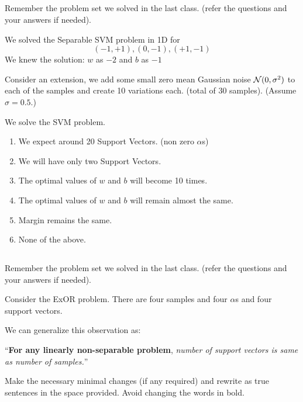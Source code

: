 \begin{frame}
\section{}
Remember the problem set we solved in the last class. (refer the questions and your answers if needed).

We solved the Separable SVM problem in 1D for
\[ (-1,+1), (0,-1), (+1,-1) \]
We knew the solution:  $w$ as $-2$ and $b$ as $-1$

Consider an extension, we add some small zero mean Gaussian noise ${\cal N}(0,\sigma^2)$ to each of the samples and create 10 variations each. (total of 30 samples). (Assume $\sigma=0.5$.)

We solve the SVM problem.
\begin{enumerate}[label=(\Alph*)]
\item We expect around 20 Support Vectors. (non zero $\alpha$s)
\item We will have only two Support Vectors.
\item The optimal values of $w$ and $b$ will become 10 times.
\item The optimal values of $w$ and $b$ will remain almost the same.    %
\item Margin remains the same.
\item None of the above.  %
\end{enumerate}
\end{frame}


\begin{frame}
\section{}
Remember the problem set we solved in the last class. (refer the questions and your answers if needed).

Consider the ExOR problem. There are four samples and four $\alpha$s and four support vectors.

We can generalize this observation as:

``{\bf For any linearly non-separable problem}, {\em number of support vectors is same as number of samples.}''

Make the necessary minimal changes  (if any required) and rewrite as true sentences in the space provided. Avoid changing the words in bold.
\end{frame}

